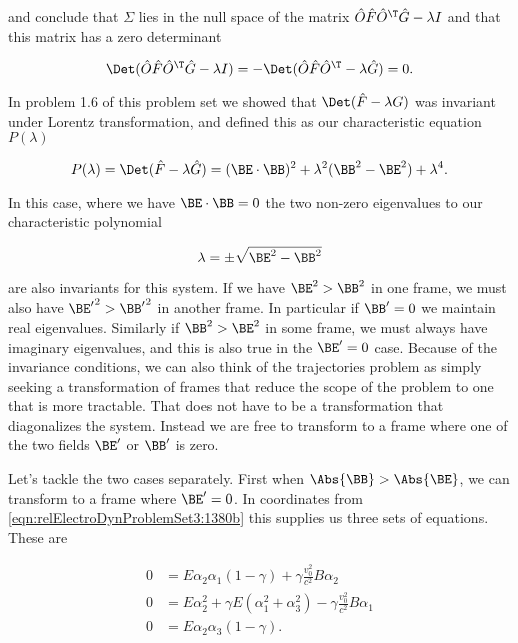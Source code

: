 and conclude that $\Sigma$ lies in the null space of the matrix $\hat{O} \hat{F} \hat{O}^\T \hat{G} - \lambda I$ and that this matrix has a zero determinant

\begin{equation}\label{eqn:relElectroDynProblemSet3:1600}
\Det (\hat{O} \hat{F} \hat{O}^\T \hat{G} - \lambda I) = -\Det (\hat{O} \hat{F} \hat{O}^\T - \lambda \hat{G}) = 0.
\end{equation}

In problem 1.6 of this problem set we showed that $\Det (\hat{F} - \lambda G)$ was invariant under Lorentz transformation, and defined this as our characteristic equation $P(\lambda)$

\begin{equation}\label{eqn:relElectroDynProblemSet3:1620}
P(\lambda) = \Det (\hat{F} - \lambda \hat{G}) = (\BE \cdot \BB)^2 + \lambda^2 (\BB^2 - \BE^2) + \lambda^4.
\end{equation}

In this case, where we have $\BE \cdot \BB = 0$ the two non-zero eigenvalues to our characteristic polynomial

\begin{equation}\label{eqn:relElectroDynProblemSet3:1640}
\lambda = \pm \sqrt{\BE^2 - \BB^2}
\end{equation}

are also invariants for this system.  If we have $\BE^2 > \BB^2$ in one frame, we must also have ${\BE'}^2 > {\BB'}^2$ in another frame.  In particular if $\BB' = 0$ we maintain real eigenvalues.  Similarly if $\BB^2 > \BE^2$ in some frame, we must always have imaginary eigenvalues, and this is also true in the $\BE' = 0$ case.  Because of the invariance conditions, we can also think of the trajectories problem as simply seeking a transformation of frames that reduce the scope of the problem to one that is more tractable.  That does not have to be a transformation that diagonalizes the system.  Instead we are free to transform to a frame where one of the two fields $\BE'$ or $\BB'$ is zero.

Let's tackle the two cases separately.  First when $\Abs{\BB} > \Abs{\BE}$, we can transform to a frame where $\BE'=0$.  In coordinates from \ref{eqn:relElectroDynProblemSet3:1380b} this supplies us three sets of equations.  These are

\begin{align}\label{eqn:relElectroDynProblemSet3:1660}
0 &= E \alpha_2 \alpha_1 (1 - \gamma) + \gamma \frac{v_0^2}{c^2} B \alpha_2  \\
0 &= E \alpha_2^2 + \gamma E (\alpha_1^2 + \alpha_3^2) - \gamma \frac{v_0^2}{c^2} B \alpha_1  \\
0 &= E \alpha_2 \alpha_3 (1 - \gamma).
\end{align}

